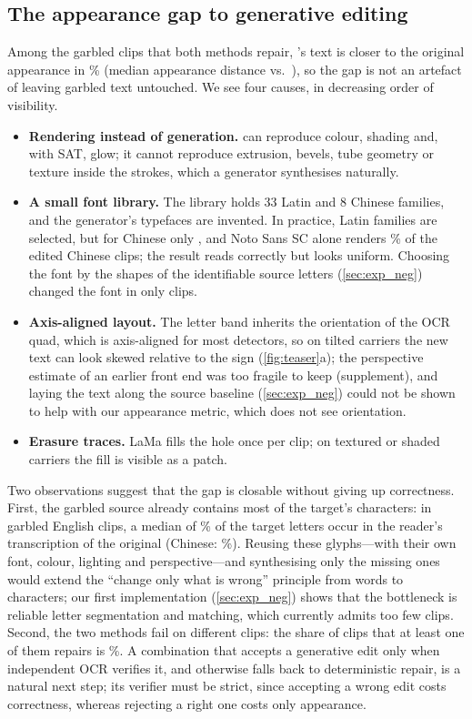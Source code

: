 \subsection{The appearance gap to generative editing}
\label{sec:limits}
Among the \rBothRepairN{} garbled clips that both methods repair, \steer's text is closer to the original appearance in \rSteerCloserPct\% (median appearance distance \rBothRepairMedSteer{} vs.\ \rBothRepairMedOurs), so the gap is not an artefact of \steer leaving garbled text untouched. We see four causes, in decreasing order of visibility.
\begin{itemize}
\item \textbf{Rendering instead of generation.} \method can reproduce colour, shading and, with SAT, glow; it cannot reproduce extrusion, bevels, tube geometry or texture inside the strokes, which a generator synthesises naturally.
\item \textbf{A small font library.} The library holds 33 Latin and 8 Chinese families, and the generator's typefaces are invented. In practice, \rLatinFam{} Latin families are selected, but for Chinese only \rZhFam, and Noto Sans SC alone renders \rNotoPct\% of the edited Chinese clips; the result reads correctly but looks uniform. Choosing the font by the shapes of the identifiable source letters (\cref{sec:exp_neg}) changed the font in only \rFshapeN{} clips.
\item \textbf{Axis-aligned layout.} The letter band inherits the orientation of the OCR quad, which is axis-aligned for most detectors, so on tilted carriers the new text can look skewed relative to the sign (\cref{fig:teaser}a); the perspective estimate of an earlier front end was too fragile to keep (supplement), and laying the text along the source baseline (\cref{sec:exp_neg}) could not be shown to help with our appearance metric, which does not see orientation.
\item \textbf{Erasure traces.} LaMa fills the hole once per clip; on textured or shaded carriers the fill is visible as a patch.
\end{itemize}
Two observations suggest that the gap is closable without giving up correctness. First, the garbled source already contains most of the target's characters: in garbled English clips, a median of \rCharsEn\% of the target letters occur in the reader's transcription of the original (Chinese: \rCharsZh\%). Reusing these glyphs---with their own font, colour, lighting and perspective---and synthesising only the missing ones would extend the ``change only what is wrong'' principle from words to characters; our first implementation (\cref{sec:exp_neg}) shows that the bottleneck is reliable letter segmentation and matching, which currently admits too few clips. Second, the two methods fail on different clips: the share of clips that at least one of them repairs is \rAtLeastOne\%. A combination that accepts a generative edit only when independent OCR verifies it, and otherwise falls back to deterministic repair, is a natural next step; its verifier must be strict, since accepting a wrong edit costs correctness, whereas rejecting a right one costs only appearance.

